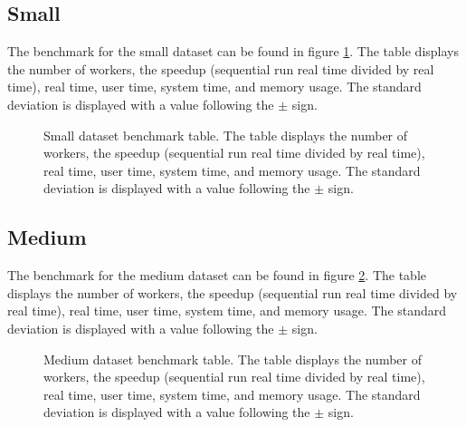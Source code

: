 \subsection{Small}
The benchmark for the small dataset can be found in figure \ref{fig:dataset_2_table}.
The table displays the number of workers, the speedup (sequential run real time divided by real time), real time,
user time, system time, and memory usage. The standard deviation is displayed with a value following the $\pm$ sign.

\begin{figure}[ht]
\centering
{}
\caption[Small dataset benchmark table.]{Small dataset benchmark table. The table displays the number of workers, the speedup (sequential run real time divided by real time), real time,
user time, system time, and memory usage. The standard deviation is displayed with a value following the $\pm$ sign.}
\label{fig:dataset_2_table}
\end{figure}

\subsection{Medium}
The benchmark for the medium dataset can be found in figure \ref{fig:dataset_3_table}.
The table displays the number of workers, the speedup (sequential run real time divided by real time), real time,
user time, system time, and memory usage. The standard deviation is displayed with a value following the $\pm$ sign.

\begin{figure}[ht]
\centering
{}
\caption[Medium dataset benchmark table.]{Medium dataset benchmark table. The table displays the number of workers, the speedup (sequential run real time divided by real time), real time,
user time, system time, and memory usage. The standard deviation is displayed with a value following the $\pm$ sign.}
\label{fig:dataset_3_table}
\end{figure}

